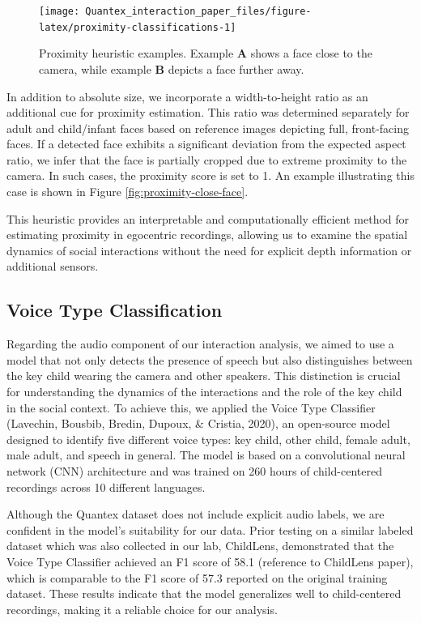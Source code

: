 \documentclass[
  man,floatsintext]{apa6}
\begin{document}
\begin{figure}

{\centering \texttt{[image: Quantex\_interaction\_paper\_files/figure-latex/proximity-classifications-1]} 

}

\caption{Proximity heuristic examples. Example \textbf{A} shows a face close to the camera, while example \textbf{B} depicts a face further away.}\label{fig:proximity-classifications}
\end{figure}

In addition to absolute size, we incorporate a width-to-height ratio as an additional cue for proximity estimation. This ratio was determined separately for adult and child/infant faces based on reference images depicting full, front-facing faces. If a detected face exhibits a significant deviation from the expected aspect ratio, we infer that the face is partially cropped due to extreme proximity to the camera. In such cases, the proximity score is set to 1. An example illustrating this case is shown in Figure \ref{fig:proximity-close-face}.

This heuristic provides an interpretable and computationally efficient method for estimating proximity in egocentric recordings, allowing us to examine the spatial dynamics of social interactions without the need for explicit depth information or additional sensors.

\subsection{Voice Type Classification}\label{voice-type-classification}

Regarding the audio component of our interaction analysis, we aimed to use a model that not only detects the presence of speech but also distinguishes between the key child wearing the camera and other speakers. This distinction is crucial for understanding the dynamics of the interactions and the role of the key child in the social context. To achieve this, we applied the Voice Type Classifier (Lavechin, Bousbib, Bredin, Dupoux, \& Cristia, 2020), an open-source model designed to identify five different voice types: key child, other child, female adult, male adult, and speech in general. The model is based on a convolutional neural network (CNN) architecture and was trained on 260 hours of child-centered recordings across 10 different languages.

Although the Quantex dataset does not include explicit audio labels, we are confident in the model's suitability for our data. Prior testing on a similar labeled dataset which was also collected in our lab, ChildLens, demonstrated that the Voice Type Classifier achieved an F1 score of 58.1 (reference to ChildLens paper), which is comparable to the F1 score of 57.3 reported on the original training dataset. These results indicate that the model generalizes well to child-centered recordings, making it a reliable choice for our analysis.
\end{document}
